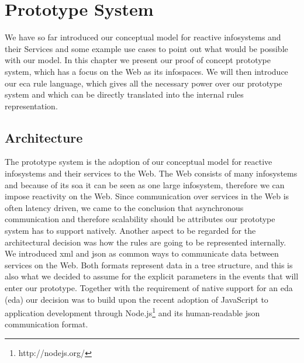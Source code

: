 

\chapter{Prototype System}
We have so far introduced our conceptual model for reactive \textrm{\glspl{infosystem}} and their Services and some example use cases to point out what would be possible with our model.
In this chapter we present our proof of concept prototype system, which has a focus on the Web as its \textrm{\glspl{infospace}}.
We will then introduce our \textrm{\acrshort{eca}} rule language, which gives all the necessary power over our prototype system and which can be directly translated into the internal rules representation.



\section{Architecture}
The prototype system is the adoption of our conceptual model for reactive \textrm{\glspl{infosystem}} and their services to the Web.
The Web consists of many \textrm{\glspl{infosystem}} and because of its \textrm{\acrlong{soa}} it can be seen as one large \textrm{\gls{infosystem}}, therefore we can impose reactivity on the Web.
Since communication over services in the Web is often latency driven, we came to the conclusion that asynchronous communication and therefore scalability should be attributes our prototype system has to support natively.
Another aspect to be regarded for the architectural decision was how the rules are going to be represented internally.
We introduced \textrm{\acrshort{xml}} and \textrm{\acrshort{json}} as common ways to communicate data between services on the Web.
Both formats represent data in a tree structure, and this is also what we decided to assume for the explicit parameters in the events that will enter our prototype.
Together with the requirement of native support for an \textrm{\acrlong{eda} (\acrshort{eda})} our decision was to build upon the recent adoption of \textrm{JavaScript} to application development through \textrm{Node.js}\footnote{http://nodejs.org/} and its human-readable \textrm{\acrshort{json}} communication format.

